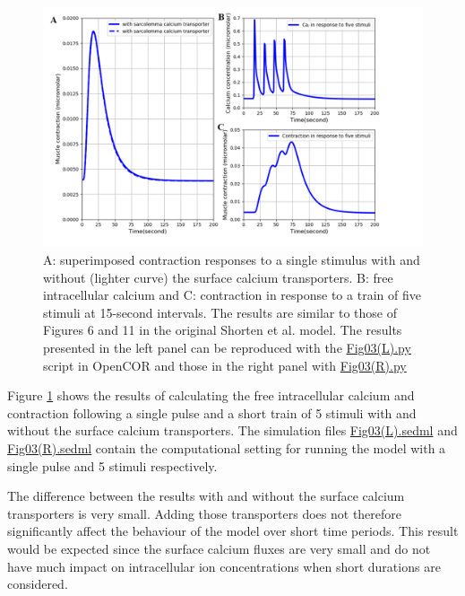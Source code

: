 \documentclass[fleqn,10pt]{physiome}
\begin{document}
\begin{figure}[ht]
\centering
\includegraphics[width=1\linewidth]{fig03.png}
\caption{A: superimposed contraction responses to a single stimulus with and without (lighter curve) the surface calcium transporters. B: free intracellular calcium and C: contraction in response to a train of five stimuli at 15-second intervals. The results are similar to those of Figures 6 and 11 in the original Shorten et al. model. The results presented in the left panel can be reproduced with the \href{https://models.physiomeproject.org/workspace/5c6/file/afd4d5cb20ecdcbc0b10198fe31795520488a34e/Fig03(L).py}{Fig03(L).py} script in OpenCOR and those in the right panel with \href{https://models.physiomeproject.org/workspace/5c6/file/afd4d5cb20ecdcbc0b10198fe31795520488a34e/Fig03(R).py}{Fig03(R).py}}
\label{fig03}
\end{figure}


Figure \ref{fig03} shows the results of calculating the free intracellular calcium and contraction following a single pulse and a short train of 5 stimuli with and without the surface calcium transporters. The simulation files \href{https://models.physiomeproject.org/workspace/5c6/file/afd4d5cb20ecdcbc0b10198fe31795520488a34e/Fig03(L).sedml}{Fig03(L).sedml} and \href{https://models.physiomeproject.org/workspace/5c6/file/afd4d5cb20ecdcbc0b10198fe31795520488a34e/Fig03(R).sedml}{Fig03(R).sedml} contain the computational setting for running the model with a single pulse and 5 stimuli respectively.

The difference between the results with and without the surface calcium transporters is very small. Adding those transporters does not therefore significantly affect the behaviour of the model over short time periods. This result would be expected since the surface calcium fluxes are very small and do not have much impact on intracellular ion concentrations when short durations are considered.
\end{document}

